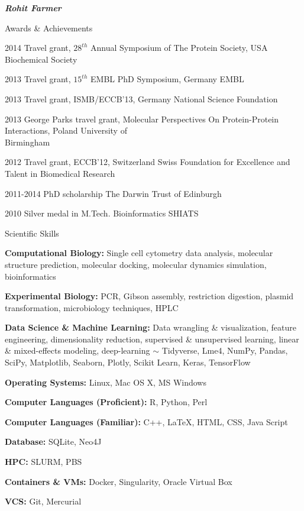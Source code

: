 \documentclass[10pt]{article}
\begin{document}
\begin{cv}{\huge \it \bfseries Rohit Farmer}
\begin{cvlist}{Awards \& Achievements}
	\item[2014] Travel grant, $28^{th}$ Annual Symposium of The Protein Society, USA \hfill Biochemical Society
	\item[2013] Travel grant, $15^{th}$ EMBL PhD Symposium, Germany \hfill EMBL
	\item[2013] Travel grant, ISMB/ECCB'13, Germany \hfill National Science Foundation
	\item[2013] George Parks travel grant,  Molecular Perspectives On Protein-Protein Interactions, Poland \hfill University of \\ \hspace*{\fill} Birmingham
	\item[2012] Travel grant, ECCB'12, Switzerland \hfill Swiss Foundation for Excellence and \\ \hspace*{\fill} Talent in Biomedical Research
	\item[2011-2014] PhD scholarship \hfill The Darwin Trust of Edinburgh
	\item[2010] Silver medal in M.Tech. Bioinformatics \hfill SHIATS
\end{cvlist}

\vskip3pt
\begin{cvlist}{Scientific Skills}
	\item[\textbf{Computational Biology:}] Single cell cytometry data analysis, molecular structure prediction, molecular docking, molecular dynamics simulation, bioinformatics
	\item[\textbf{Experimental Biology:}] PCR, Gibson assembly, restriction digestion, plasmid transformation, microbiology techniques, HPLC
    \item[\textbf{Data Science \& Machine Learning:}] Data wrangling \& visualization, feature engineering, dimensionality reduction, supervised \& unsupervised learning, linear \& mixed-effects modeling, deep-learning $ \sim $ Tidyverse, Lme4, NumPy, Pandas, SciPy, Matplotlib, Seaborn, Plotly, Scikit Learn, Keras, TensorFlow
	\item[\textbf{Operating Systems:}] Linux, Mac OS X, MS Windows
	\item[\textbf{Computer Languages (Proficient):}] R, Python, Perl
	\item[\textbf{Computer Languages (Familiar):}] C++, \LaTeX, HTML, CSS, Java Script
	\item[\textbf{Database:}] SQLite, Neo4J
	\item[\textbf{HPC:}] SLURM, PBS
	\item[\textbf{Containers \& VMs:}] Docker, Singularity, Oracle Virtual Box
	\item[\textbf{VCS:}] Git, Mercurial
\end{cvlist}


\end{cv}
\end{document}
